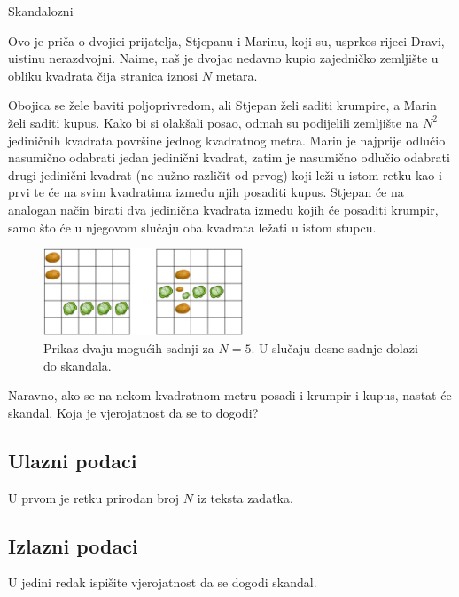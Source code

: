 \begin{statement}[
  problempoints=100,
  timelimit=1 sekunda,
  memorylimit=512 MiB,
]{Skandalozni}

Ovo je priča o dvojici prijatelja, Stjepanu i Marinu, koji su, usprkos
rijeci Dravi, uistinu nerazdvojni. Naime, naš je dvojac nedavno kupio
zajedničko zemljište u obliku kvadrata čija stranica iznosi $N$ metara.

Obojica se žele baviti poljoprivredom, ali Stjepan želi saditi krumpire, a
Marin želi saditi kupus. Kako bi si olakšali posao, odmah su podijelili
zemljište na $N^2$ jediničnih kvadrata površine jednog kvadratnog metra.
Marin je najprije odlučio nasumično odabrati jedan jedinični kvadrat, zatim
je nasumično odlučio odabrati drugi jedinični kvadrat (ne nužno različit od
prvog) koji leži u istom retku kao i prvi te će na svim kvadratima između
njih posaditi kupus. Stjepan će na analogan način birati dva jedinična kvadrata
između kojih će posaditi krumpir, samo što će u njegovom slučaju oba kvadrata
ležati u istom stupcu.

\begin{figure}[H]
\centering
\includegraphics[width=0.53\textwidth]{img/skandal_skica.png}
\caption*{Prikaz dvaju mogućih sadnji za $N=5$. U slučaju desne sadnje dolazi do skandala.}
\end{figure}
\vspace{-0.5cm}

Naravno, ako se na nekom kvadratnom metru posadi i krumpir i kupus, nastat će
skandal. Koja je vjerojatnost da se to dogodi?

\subsection*{Ulazni podaci}
U prvom je retku prirodan broj $N$ iz teksta zadatka.

\subsection*{Izlazni podaci}
U jedini redak ispišite vjerojatnost da se dogodi skandal.


\end{statement}
